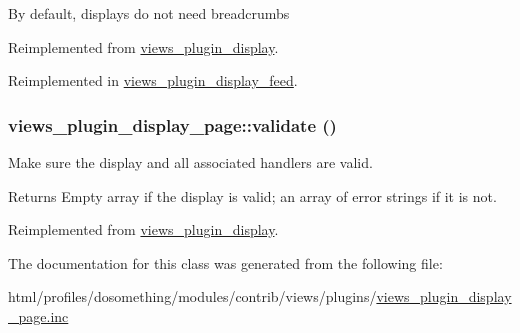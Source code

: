 By default, displays do not need breadcrumbs 

Reimplemented from \hyperlink{classviews__plugin__display_ab3d2779948700bcc6c5ee3b26726f468}{views\_\-plugin\_\-display}.

Reimplemented in \hyperlink{classviews__plugin__display__feed_a4bc729e21f5578c13d420bbaf3c388c5}{views\_\-plugin\_\-display\_\-feed}.\hypertarget{classviews__plugin__display__page_a995cf48d67e20ef897d931fcbba391d1}{
\subsubsection[{validate}]{\setlength{\rightskip}{0pt plus 5cm}views\_\-plugin\_\-display\_\-page::validate ()}}
\label{classviews__plugin__display__page_a995cf48d67e20ef897d931fcbba391d1}
Make sure the display and all associated handlers are valid.

\begin{DoxyReturn}{Returns}
Empty array if the display is valid; an array of error strings if it is not. 
\end{DoxyReturn}


Reimplemented from \hyperlink{classviews__plugin__display_a3282edb1b32b756937fe2d0c8757c80c}{views\_\-plugin\_\-display}.

The documentation for this class was generated from the following file:\begin{DoxyCompactItemize}
\item 
html/profiles/dosomething/modules/contrib/views/plugins/\hyperlink{views__plugin__display__page_8inc}{views\_\-plugin\_\-display\_\-page.inc}\end{DoxyCompactItemize}
